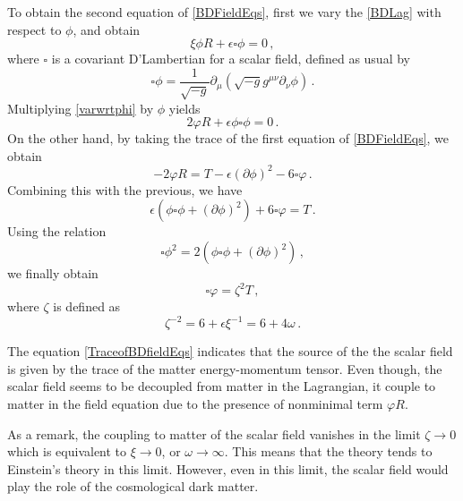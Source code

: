 \documentclass[12pt]{article}
\begin{document}
To obtain the second equation of \eqref{BDFieldEqs}, first we vary the \eqref{BDLag} with respect to $\phi$, and obtain
\begin{equation}\label{varwrtphi}
\xi \phi R+\epsilon \square \phi=0 \,,
\end{equation}
where $\square$ is a covariant D'Lambertian for a scalar field, defined as usual by
\begin{equation}
\square \phi=\frac{1}{\sqrt{-g}} \partial_{\mu}\left(\sqrt{-g} g^{\mu \nu} \partial_{\nu} \phi\right) \,. 
\end{equation}
Multiplying \eqref{varwrtphi} by $\phi$ yields
\begin{equation}
2 \varphi R+\epsilon \phi \square \phi=0 \,.
\end{equation}
On the other hand, by taking the trace of the first equation of \eqref{BDFieldEqs}, we obtain
\begin{equation}
-2 \varphi R=T-\epsilon(\partial \phi)^{2}-6 \square \varphi \,.
\end{equation}
Combining this with the previous, we have
\begin{equation}
\epsilon\left(\phi \square \phi+(\partial \phi)^{2}\right)+6 \square \varphi=T \,.
\end{equation}
Using the relation
\begin{equation}
\square \phi^{2}=2\left(\phi \square \phi+(\partial \phi)^{2}\right) \,,
\end{equation}
we finally obtain
\begin{equation}\label{TraceofBDfieldEqs}
\square \varphi=\zeta^{2} T \,,
\end{equation}
where $\zeta$ is defined as
\begin{equation}
\zeta^{-2}=6+\epsilon \xi^{-1}=6+4 \omega \,.
\end{equation}


The equation \eqref{TraceofBDfieldEqs} indicates that the source of the the scalar field is given by the trace of the matter energy-momentum tensor. 
Even though, the scalar field seems to be decoupled from matter in the Lagrangian, it couple to matter in the field equation due to the presence of nonminimal term $\varphi R$.

As a remark, the coupling to matter of the scalar field vanishes in the limit $\zeta \rightarrow 0$ which is equivalent to $\xi \rightarrow 0$, or $\omega \rightarrow \infty$. 
This means that the theory tends to Einstein's theory in this limit. However, even in this limit, the scalar field would play the role of the cosmological dark matter.
\end{document}
